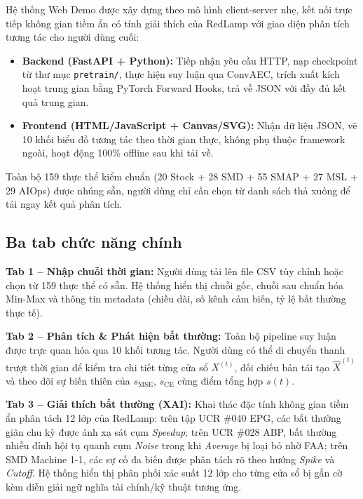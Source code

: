 \documentclass[sigconf,nonacm]{acmart}
\begin{document}
Hệ thống Web Demo được xây dựng theo mô hình client-server nhẹ, kết nối trực tiếp không gian tiềm ẩn có tính giải thích của RedLamp với giao diện phân tích tương tác cho người dùng cuối:

\begin{itemize}[leftmargin=*, itemsep=2pt, parsep=0pt]
    \item \textbf{Backend (FastAPI + Python):} Tiếp nhận yêu cầu HTTP, nạp checkpoint từ thư mục \texttt{pretrain/}, thực hiện suy luận qua ConvAEC, trích xuất kích hoạt trung gian bằng PyTorch Forward Hooks, trả về JSON với đầy đủ kết quả trung gian.
    \item \textbf{Frontend (HTML/JavaScript + Canvas/SVG):} Nhận dữ liệu JSON, vẽ 10 khối biểu đồ tương tác theo thời gian thực, không phụ thuộc framework ngoài, hoạt động 100\% offline sau khi tải về.
\end{itemize}

Toàn bộ 159 thực thể kiểm chuẩn (20 Stock + 28 SMD + 55 SMAP + 27 MSL + 29 AIOps) được nhúng sẵn, người dùng chỉ cần chọn từ danh sách thả xuống để tải ngay kết quả phân tích.

\subsection{Ba tab chức năng chính}

\textbf{Tab 1 -- Nhập chuỗi thời gian:} Người dùng tải lên file CSV tùy chỉnh hoặc chọn từ 159 thực thể có sẵn. Hệ thống hiển thị chuỗi gốc, chuỗi sau chuẩn hóa Min-Max và thông tin metadata (chiều dài, số kênh cảm biến, tỷ lệ bất thường thực tế).

\textbf{Tab 2 -- Phân tích \& Phát hiện bất thường:} Toàn bộ pipeline suy luận được trực quan hóa qua 10 khối tương tác. Người dùng có thể di chuyển thanh trượt thời gian để kiểm tra chi tiết từng cửa sổ $X^{(t)}$, đối chiếu bản tái tạo $\hat{X}^{(t)}$ và theo dõi sự biến thiên của $s_{\text{MSE}}$, $s_{\text{CE}}$ cùng điểm tổng hợp $s(t)$.

\textbf{Tab 3 -- Giải thích bất thường (XAI):} Khai thác đặc tính không gian tiềm ẩn phân tách 12 lớp của RedLamp: trên tập UCR \#040 EPG, các bất thường giãn chu kỳ được ánh xạ sát cụm \textit{Speedup}; trên UCR \#028 ABP, bất thường nhiễu đỉnh hội tụ quanh cụm \textit{Noise} trong khi \textit{Average} bị loại bỏ nhờ FAA; trên SMD Machine 1-1, các sự cố đa biến được phân tách rõ theo hướng \textit{Spike} và \textit{Cutoff}. Hệ thống hiển thị phân phối xác suất 12 lớp cho từng cửa sổ bị gắn cờ kèm diễn giải ngữ nghĩa tài chính/kỹ thuật tương ứng.
\end{document}

